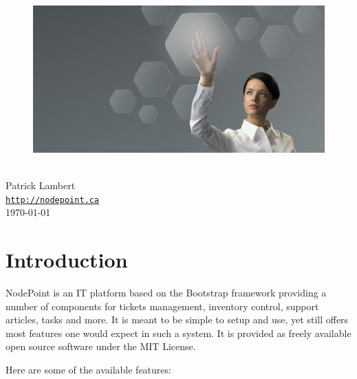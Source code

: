 \documentclass[11pt]{article}
\begin{document}
\begin{titlepage}
\bigskip
\begin{center}
\begin{figure}
\includegraphics{splash.jpg}
\end{figure}
\vspace*{1cm}
{
{\Huge \color{headings}{\NodePointManual}}\\
\bigskip
{\Large Patrick Lambert}\\
\texttt{\url{http://nodepoint.ca}}\\ 
\bigskip
\today}
\vspace*{\fill}
\end{center}
\end{titlepage}

\tableofcontents

\newpage

\section{Introduction}

NodePoint is an IT platform based on the Bootstrap framework providing a number of components for tickets management, inventory control, support articles, tasks and more. It is meant to be simple to setup and use, yet still offers most features one would expect in such a system. It is provided as freely available open source software under the MIT License.

Here are some of the available features:
\end{document}
